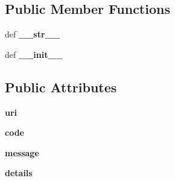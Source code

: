 \subsection*{Public Member Functions}
\begin{DoxyCompactItemize}
\item 
\hypertarget{classcheshire3_1_1cql_parser_1_1_diagnostic_a10de967398f1b05a559b0aa79f5aa30e}{def {\bfseries \-\_\-\-\_\-str\-\_\-\-\_\-}}\label{classcheshire3_1_1cql_parser_1_1_diagnostic_a10de967398f1b05a559b0aa79f5aa30e}

\item 
\hypertarget{classcheshire3_1_1cql_parser_1_1_diagnostic_a41645a646a9e9f613e3f36dce6f9a1d3}{def {\bfseries \-\_\-\-\_\-init\-\_\-\-\_\-}}\label{classcheshire3_1_1cql_parser_1_1_diagnostic_a41645a646a9e9f613e3f36dce6f9a1d3}

\end{DoxyCompactItemize}
\subsection*{Public Attributes}
\begin{DoxyCompactItemize}
\item 
\hypertarget{classcheshire3_1_1cql_parser_1_1_diagnostic_a274a6778d3e5bdb3c51ffc52202596b8}{{\bfseries uri}}\label{classcheshire3_1_1cql_parser_1_1_diagnostic_a274a6778d3e5bdb3c51ffc52202596b8}

\item 
\hypertarget{classcheshire3_1_1cql_parser_1_1_diagnostic_a9f815a99ae716c3778adb53a0a67f0ea}{{\bfseries code}}\label{classcheshire3_1_1cql_parser_1_1_diagnostic_a9f815a99ae716c3778adb53a0a67f0ea}

\item 
\hypertarget{classcheshire3_1_1cql_parser_1_1_diagnostic_ac34beba9dfd0037deee548f686cdb1aa}{{\bfseries message}}\label{classcheshire3_1_1cql_parser_1_1_diagnostic_ac34beba9dfd0037deee548f686cdb1aa}

\item 
\hypertarget{classcheshire3_1_1cql_parser_1_1_diagnostic_a4b52119e77047b3300c648fe654efe14}{{\bfseries details}}\label{classcheshire3_1_1cql_parser_1_1_diagnostic_a4b52119e77047b3300c648fe654efe14}

\end{DoxyCompactItemize}
